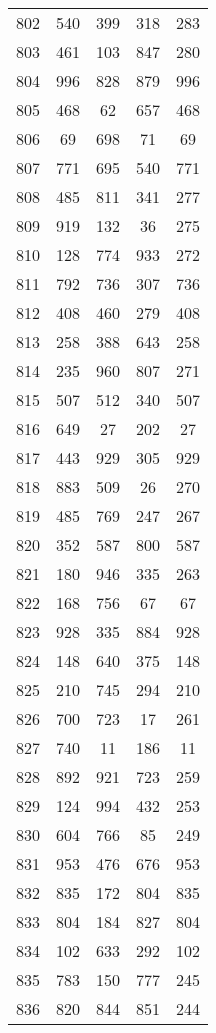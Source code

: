 \documentclass[a4paper,10pt,ngerman]{scrartcl}
\begin{document}
\begin{longtable}[c]{c|c|c|c|c}
    802 & 540 & 399 & 318 & 283 \\
    803 & 461 & 103 & 847 & 280 \\
    804 & 996 & 828 & 879 & 996 \\
    805 & 468 & 62 & 657 & 468 \\
    806 & 69 & 698 & 71 & 69 \\
    807 & 771 & 695 & 540 & 771 \\
    808 & 485 & 811 & 341 & 277 \\
    809 & 919 & 132 & 36 & 275 \\
    810 & 128 & 774 & 933 & 272 \\
    811 & 792 & 736 & 307 & 736 \\
    812 & 408 & 460 & 279 & 408 \\
    813 & 258 & 388 & 643 & 258 \\
    814 & 235 & 960 & 807 & 271 \\
    815 & 507 & 512 & 340 & 507 \\
    816 & 649 & 27 & 202 & 27 \\
    817 & 443 & 929 & 305 & 929 \\
    818 & 883 & 509 & 26 & 270 \\
    819 & 485 & 769 & 247 & 267 \\
    820 & 352 & 587 & 800 & 587 \\
    821 & 180 & 946 & 335 & 263 \\
    822 & 168 & 756 & 67 & 67 \\
    823 & 928 & 335 & 884 & 928 \\
    824 & 148 & 640 & 375 & 148 \\
    825 & 210 & 745 & 294 & 210 \\
    826 & 700 & 723 & 17 & 261 \\
    827 & 740 & 11 & 186 & 11 \\
    828 & 892 & 921 & 723 & 259 \\
    829 & 124 & 994 & 432 & 253 \\
    830 & 604 & 766 & 85 & 249 \\
    831 & 953 & 476 & 676 & 953 \\
    832 & 835 & 172 & 804 & 835 \\
    833 & 804 & 184 & 827 & 804 \\
    834 & 102 & 633 & 292 & 102 \\
    835 & 783 & 150 & 777 & 245 \\
    836 & 820 & 844 & 851 & 244 \\

\end{longtable}
\end{document}
